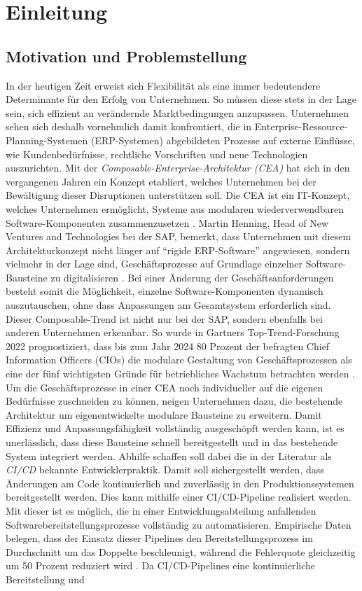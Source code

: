 \section{Einleitung}

\subsection{Motivation und Problemstellung}
In der heutigen Zeit erweist sich Flexibilität als eine immer bedeutendere Determinante für den Erfolg von Unternehmen. So müssen diese stets in der Lage sein, sich effizient an verändernde Marktbedingungen anzupassen. Unternehmen sehen sich deshalb vornehmlich damit konfrontiert, die in Enterprise-Ressource-Planning-Systemen (\acs{ERP}-Systemen) abgebildeten Prozesse auf externe Einflüsse, wie Kundenbedürfnisse, rechtliche Vorschriften und neue Technologien auszurichten. Mit der \textit{Composable-Enterprise-Architektur (CEA)} hat sich in den vergangenen Jahren ein Konzept etabliert, welches Unternehmen bei der Bewältigung dieser Disruptionen unterstützen soll. Die CEA ist ein IT-Konzept, welches Unternehmen ermöglicht, Systeme aus modularen wiederverwendbaren Software-Kompo\-nenten zusammenzusetzen \cite{.20230313}. Martin Henning, Head of New Ventures and Technologies bei der SAP, bemerkt, dass Unternehmen mit diesem Architekturkonzept nicht länger auf \enquote{rigide ERP-Software} angewiesen, sondern vielmehr in der Lage sind, Geschäftsprozesse auf Grundlage einzelner Software-Bausteine zu digitalisieren \cite{Galer.20221019}. Bei einer Änderung der Geschäftsanforderungen besteht somit die Möglichkeit, einzelne Software-Komponenten dynamisch auszutauschen, ohne dass Anpassungen am Gesamtsystem erforderlich sind. Dieser Composable-Trend ist nicht nur bei der SAP, sondern ebenfalls bei anderen Unternehmen erkennbar. So wurde in Gartners Top-Trend-Forschung 2022 prognostiziert, dass bis zum Jahr 2024 80 Prozent der befragten Chief Information Officers (\acs{CIO}s) die modulare Gestaltung von Geschäftsprozessen als eine der fünf wichtigsten Gründe für betriebliches Wachstum betrachten werden \cite{Gartner.20230408}. Um die Geschäftsprozesse in einer CEA noch individueller auf die eigenen Bedürfnisse zuschneiden zu können, neigen Unternehmen dazu, die bestehende Architektur um eigenentwickelte modulare Bausteine zu erweitern. Damit Effizienz und Anpassungsfähigkeit vollständig ausgeschöpft werden kann, ist es unerlässlich, dass diese Bausteine schnell bereitgestellt und in das bestehende System integriert werden. Abhilfe schaffen soll dabei die in der Literatur als \textit{\ac{CI/CD}} bekannte Entwicklerpraktik. Damit soll sichergestellt werden, dass Änderungen am Code kontinuierlich und zuverlässig in den Produktionssystemen bereitgestellt werden. Dies kann mithilfe einer CI/CD-Pipeline realisiert werden. Mit dieser ist es möglich, die in einer Entwicklungsabteilung anfallenden Softwarebereitstellungsprozesse vollständig zu automatisieren. Empirische Daten belegen, dass der Einsatz dieser Pipelines den Bereitstellungsprozess im Durchschnitt um das Doppelte beschleunigt, während die Fehlerquote gleichzeitig um 50 Prozent reduziert wird \cite{abdalslam.20230128}. Da CI/CD-Pipelines eine kontinuierliche Bereitstellung und 
